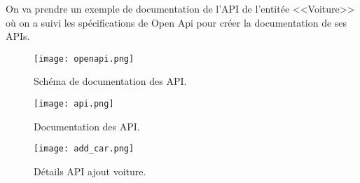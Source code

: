 On va prendre un exemple de documentation de l'API de l'entitée <<Voiture>> où on a suivi les spécifications de Open Api pour créer la documentation de ses APIs.
\begin{figure}[H]
    \centering
    \texttt{[image: openapi.png]}
    \captionsetup{justification=centering}
    \caption{Schéma de documentation des API.}
    \label{fig:api_doc_schema}
\end{figure}
\newpage
\begin{figure}[H]
    \centering
    \texttt{[image: api.png]}
    \captionsetup{justification=centering}
    \caption{Documentation des API.}
    \label{fig:api_doc}
\end{figure}
\begin{figure}[H]
    \centering
    \texttt{[image: add\_car.png]}
    \captionsetup{justification=centering}
    \caption{Détails API ajout voiture.}
    \label{fig:api_doc_detail}
\end{figure}
\clearpage
